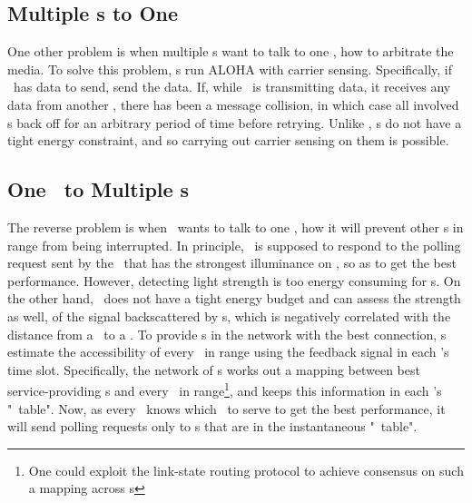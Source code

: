 \subsection{Multiple \reader\/s to One \vitag}
\label{subsec:multireaderto}
One other problem is when multiple \reader\/s want to talk to one \vitag, how to arbitrate the media. To solve this problem, \reader\/s run ALOHA with carrier sensing. Specifically, if \reader\ has data to send, send the data. If, while \reader\ is transmitting data, it receives any data from another \reader, there has been a message collision, in which case all involved \reader\/s back off for an arbitrary period of time before retrying. Unlike \vitag, \reader\/s do not have a tight energy constraint, and so carrying out carrier sensing on them is possible.

\subsection{One \vitag\ to Multiple \reader\/s}
\label{onetagto}
The reverse problem is when \vitag\ wants to talk to one \reader, how it will prevent other \reader\/s in range from being interrupted. In principle, \vitag\ is supposed to respond to the polling request sent by the \reader\ that has the strongest illuminance on \vitag, so as to get the best performance. However, detecting light strength is too energy consuming for \vitag\/s. On the other hand, \reader\ does not have a tight energy budget and can assess the strength as well, of the signal backscattered by \vitag\/s, which is negatively correlated with the distance from a \vitag\ to a \reader. To provide \vitag\/s in the network with the best connection, \reader\/s estimate the accessibility of every \vitag\ in range using the feedback signal in each \vitag's time slot. Specifically, the network of \reader\/s works out a mapping between best service-providing \reader\/s and every \vitag\ in range\footnote{One could exploit the link-state routing protocol to achieve  consensus on such a mapping across \reader\/s}, and keeps this information in each \reader's "\vitag\ table". Now, as every \reader\ knows which \vitag\ to serve to get the best performance, it will send polling requests only to \vitag\/s that are in the instantaneous "\vitag\ table".

